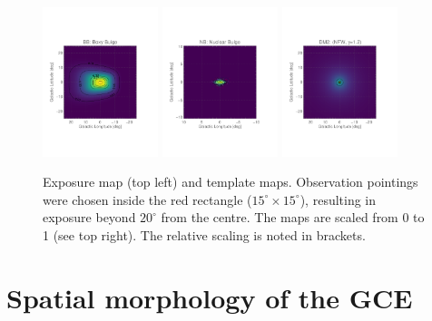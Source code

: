 \documentclass[doublespace,nopageskip]{VTthesis} %
\begin{document}
\begin{figure}[htb]
	\centering
 	\includegraphics[width=0.3\textwidth,trim=0.44in 2.03in 1.29in 2.34in,clip=true]{Figures/511keV/map_BB_asinh_grid.pdf}
 	\includegraphics[width=0.3\textwidth,trim=0.44in 2.03in 1.29in 2.34in,clip=true]{Figures/511keV/map_NB_log_grid_20x20.pdf}
 	\includegraphics[width=0.3\textwidth,trim=0.44in 2.03in 1.29in 2.34in,clip=true]{Figures/511keV/map_DM2_log_grid.pdf}
	\caption{Exposure map (top left) and template maps. Observation pointings were chosen inside the red rectangle ($15^{\circ} \times 15^{\circ}$), resulting in exposure beyond $20^{\circ}$ from the centre. The maps are scaled from 0 to 1 (see top right). The relative scaling is noted in brackets.}
\end{figure}

\section{Spatial morphology of the GCE}
\end{document}

